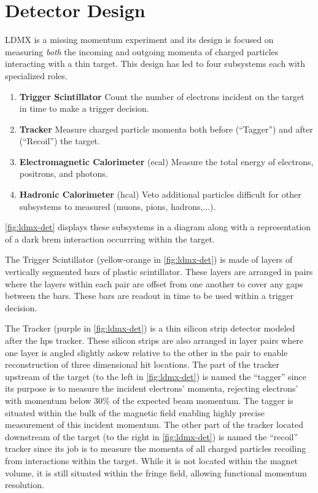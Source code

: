\section{Detector Design}
LDMX is a missing momentum experiment and its design is focused on measuring \emph{both} the
incoming and outgoing momenta of charged particles interacting with a thin target. This design has
led to four subsystems each with specialized roles.
\begin{enumerate}
  \item \textbf{Trigger Scintillator} Count the number of electrons incident on the target in time to make a trigger decision.
  \item \textbf{Tracker} Measure charged particle momenta both before (``Tagger'') and after (``Recoil'') the target.
  \item \textbf{Electromagnetic Calorimeter} (\gls{ecal}) Measure the total energy of electrons, positrons, and photons.
  \item \textbf{Hadronic Calorimeter} (\gls{hcal}) Veto additional particles difficult for other subsystems to measured (muons, pions, hadrons,...).
\end{enumerate}
\cref{fig:ldmx-det} displays these subsystems in a diagram along with a representation of
a dark brem interaction occurrring within the target.

The Trigger Scintillator (yellow-orange in \cref{fig:ldmx-det}) is made of layers of vertically
segmented bars of plastic scintillator. These layers are arranged in pairs where the layers within
each pair are offset from one another to cover any gaps between the bars. These bars are readout in
time to be used within a trigger decision.

The Tracker (purple in \cref{fig:ldmx-det}) is a thin silicon strip detector modeled after the
\gls{hps} tracker. These silicon strips are also arranged in layer pairs where one layer is angled
slightly askew relative to the other in the pair to enable reconstruction of three dimensional hit
locations. The part of the tracker upstream of the target (to the left in \cref{fig:ldmx-det}) is
named the ``tagger'' since its purpose is to measure the incident electrons' momenta, rejecting
electrons' with momentum below $30\%$ of the expected beam momentum. The tagger is situated within
the bulk of the magnetic field enabling highly precise measurement of this incident momentum. The
other part of the tracker located downstream of the target (to the right in \cref{fig:ldmx-det}) is
named the ``recoil'' tracker since its job is to measure the momenta of all charged particles
recoiling from interactions within the target. While it is not located within the magnet volume, it
is still situated within the fringe field, allowing functional momentum resolution.

